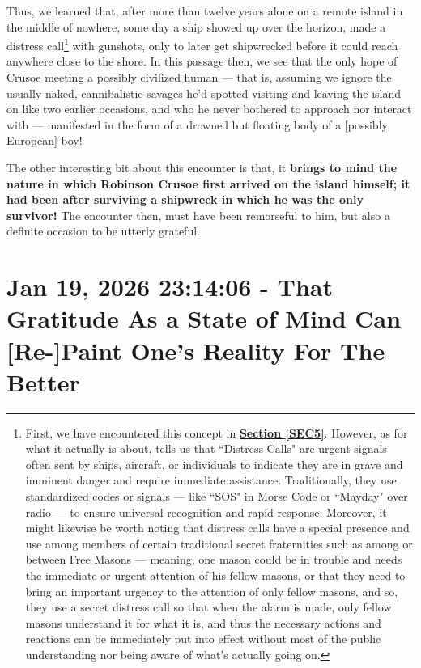 \documentclass[a4paper]{article}
\begin{document}
Thus, we learned that, after more than twelve years alone on a remote island in the middle of nowhere, some day a ship showed up over the horizon, made a distress call\footnote{First, we have encountered this concept in \textbf{\hyperref[SEC5]{Section \ref{SEC5}}}. However, as for what it actually is about, \cite{copilot_assistant} tells us that ``Distress Calls" are urgent signals often sent by ships, aircraft, or individuals to indicate they are in grave and imminent danger and require immediate assistance. Traditionally, they use standardized codes or signals --- like ``SOS" in Morse Code or ``Mayday" over radio --- to ensure universal recognition and rapid response. Moreover, it might likewise be worth noting that distress calls have a special presence and use among members of certain traditional secret fraternities such as among or between Free Masons --- meaning, one mason could be in trouble and needs the immediate or urgent attention of his fellow masons, or that they need to bring an important urgency to the attention of only fellow masons, and so, they use a secret distress call so that when the alarm is made, only fellow masons understand it for what it is, and thus the necessary actions and reactions can be immediately put into effect without most of the public understanding nor being aware of what's actually going on.} with gunshots, only to later get shipwrecked before it could reach anywhere close to the shore. In this passage then, we see that the only hope of Crusoe meeting a possibly civilized human --- that is, assuming we ignore the usually naked, cannibalistic savages he'd spotted visiting and leaving the island on like two earlier occasions, and who he never bothered to approach nor interact with --- manifested in the form of a drowned but floating body of a [possibly European] boy!

The other interesting bit about this encounter is that, it \textbf{brings to mind the nature in which Robinson Crusoe first arrived on the island himself; it had been after surviving a shipwreck in which he was the only survivor!} The encounter then, must have been remorseful to him, but also a definite occasion to be utterly grateful.





\section{Jan 19, 2026 23:14:06 - That Gratitude As a State of Mind Can [Re-]Paint One's Reality For The Better}
\label{SEC48}
\end{document}
